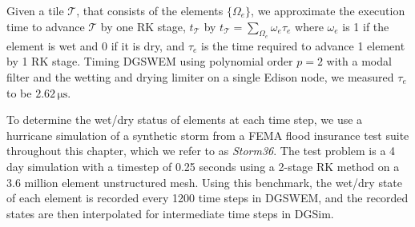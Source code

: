  Given a tile $\mathcal{T}$, that consists of the elements $\{\Omega_e\}$, we approximate the execution time to advance $\mathcal{T}$ by one RK stage, $t_{\mathcal{T}}$ by 
$t_{\mathcal{T}} = \sum_{\Omega_e} \omega_e \tau_e$ 
where $\omega_e$ is 1 if the element is wet and 0 if it is dry, and $\tau_e$ is the time required to advance 1 element by 1 RK stage.
Timing DGSWEM using polynomial order $p=2$ with a modal filter and the wetting and drying limiter on a single Edison node, we measured $\tau_e$ to be $2.62\,\mathrm{\mu s}$.

To determine the wet/dry status of elements at each time step, we use a hurricane simulation of a synthetic storm from a FEMA flood insurance test suite throughout this chapter, which we refer to as {\em Storm36}. The test problem is a 4 day simulation with a timestep of 0.25 seconds using a 2-stage RK method on a 3.6 million element unstructured mesh.
Using this benchmark, the wet/dry state of each element is recorded every 1200 time steps in DGSWEM, and the recorded states are then interpolated for intermediate time steps in DGSim.

